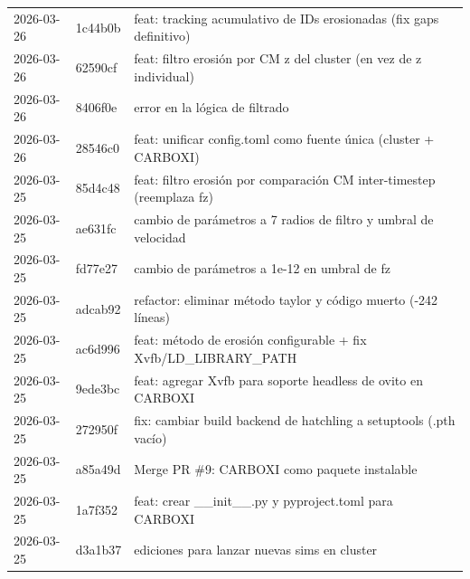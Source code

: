 \documentclass[12pt,a4paper]{article}
\begin{document}
\begin{longtable}{@{}llp{10cm}@{}}
	2026-03-26     & 1c44b0b         & feat: tracking acumulativo de IDs erosionadas (fix gaps definitivo)                                                   \\
	2026-03-26     & 62590cf         & feat: filtro erosión por CM z del cluster (en vez de z individual)                                                    \\
	2026-03-26     & 8406f0e         & error en la lógica de filtrado                                                                                        \\
	2026-03-26     & 28546c0         & feat: unificar config.toml como fuente única (cluster + CARBOXI)                                                      \\
	2026-03-25     & 85d4c48         & feat: filtro erosión por comparación CM inter-timestep (reemplaza fz)                                                 \\
	2026-03-25     & ae631fc         & cambio de parámetros a 7 radios de filtro y umbral de velocidad                                                       \\
	2026-03-25     & fd77e27         & cambio de parámetros a 1e-12 en umbral de fz                                                                          \\
	2026-03-25     & adcab92         & refactor: eliminar método taylor y código muerto (-242 líneas)                                                        \\
	2026-03-25     & ac6d996         & feat: método de erosión configurable + fix Xvfb/LD\_LIBRARY\_PATH                                                     \\
	2026-03-25     & 9ede3bc         & feat: agregar Xvfb para soporte headless de ovito en CARBOXI                                                          \\
	2026-03-25     & 272950f         & fix: cambiar build backend de hatchling a setuptools (.pth vacío)                                                     \\
	2026-03-25     & a85a49d         & Merge PR \#9: CARBOXI como paquete instalable                                                                         \\
	2026-03-25     & 1a7f352         & feat: crear \_\_init\_\_.py y pyproject.toml para CARBOXI                                                             \\
	2026-03-25     & d3a1b37         & ediciones para lanzar nuevas sims en cluster                                                                          \\

\end{longtable}
\end{document}

